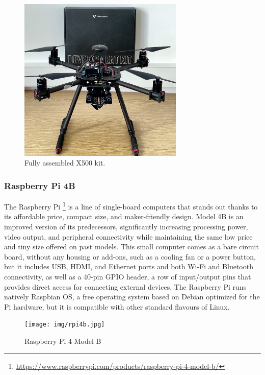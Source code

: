 \begin{figure}
  \centering
  \includegraphics[width=0.7\textwidth,keepaspectratio]{img/X500-assembled.jpg}
  \caption{Fully assembled X500 kit.}
  \label{fig:x500}
\end{figure}

\subsubsection{Raspberry Pi 4B}
\label{subsec:rpi}
The Raspberry Pi \footnote{\url{https://www.raspberrypi.com/products/raspberry-pi-4-model-b/}} is a line of single-board computers that stands out thanks to its affordable price,
compact size, and maker-friendly design. Model 4B is an improved version of its predecessors,
significantly increasing processing power, video output, and peripheral connectivity
while maintaining the same low price and tiny size offered on past models.
This small computer comes as a bare circuit board,
without any housing or add-ons, such as a cooling fan or a power button,
but it includes USB, HDMI, and Ethernet ports and both Wi-Fi and Bluetooth connectivity,
as well as a 40-pin GPIO header, a row of input/output pins that provides direct access for connecting external devices.
The Raspberry Pi runs natively Raspbian OS, a free operating system based on Debian optimized for the Pi hardware, but it is compatible with other standard flavours of Linux.

\begin{figure}
  \centering
  \texttt{[image: img/rpi4b.jpg]}
  \caption{Raspberry Pi 4 Model B}
  \label{fig:rpi4b}
\end{figure}
